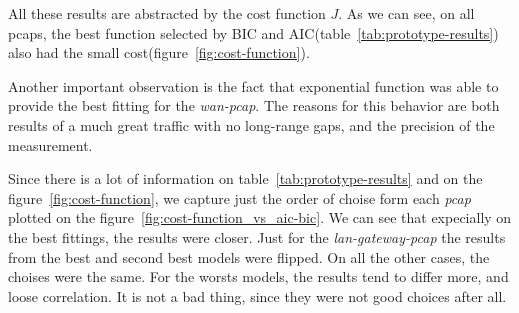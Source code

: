 All these results are abstracted by the cost function $J$. As we can see, on all pcaps, the best function selected by BIC and AIC(table~\ref{tab:prototype-results}) also had the small cost(figure~\ref{fig:cost-function}). 

Another important observation is the fact that exponential function was able to provide the best fitting for the \textit{wan-pcap}. The reasons for this behavior are both results of a much great traffic with no long-range gaps, and the precision of the measurement.


Since there is a lot of information on table~\ref{tab:prototype-results} and on the figure~\ref{fig:cost-function}, we capture just the order of choise form each \textit{pcap} plotted on the figure~\ref{fig:cost-function_vs_aic-bic}. We can see that expecially on the best fittings, the results were closer. Just for the \textit{lan-gateway-pcap} the results from the best and second best models were flipped. On all the other cases, the choises were the same. For the worsts models, the results tend to differ more, and loose correlation. It is not a bad thing, since they were not good choices after all. 



